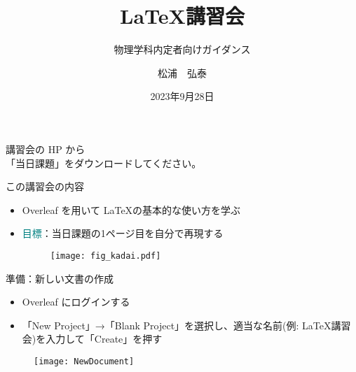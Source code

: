 \documentclass[dvipdfmx]{beamer}
\title{\LaTeX 講習会}
\author{松浦　弘泰}
\date{2023年9月28日}
\subtitle{物理学科内定者向けガイダンス}
\begin{document}
\begin{frame}
\titlepage
\centering
\footnotesize{講習会の HP から\\「当日課題」をダウンロードしてください。}

\end{frame}

\begin{frame}{この講習会の内容}
\begin{itemize}
    \item Overleaf を用いて \LaTeX の基本的な使い方を学ぶ
    
    \bigskip
    \item \textcolor{teal}{目標}：当日課題の1ページ目を自分で再現する
    \begin{figure}
        \centering
        \texttt{[image: fig\_kadai.pdf]}
    \end{figure}
\end{itemize}
\end{frame}

\begin{frame}[fragile]{準備：新しい文書の作成}
\begin{itemize}
    \item Overleaf にログインする
    \item 「New Project」→「Blank Project」を選択し、適当な名前(例: LaTeX講習会)を入力して「Create」を押す
\end{itemize}
\begin{figure}
    \centering
    \texttt{[image: NewDocument]}
\end{figure}
\end{frame}
\end{document}
